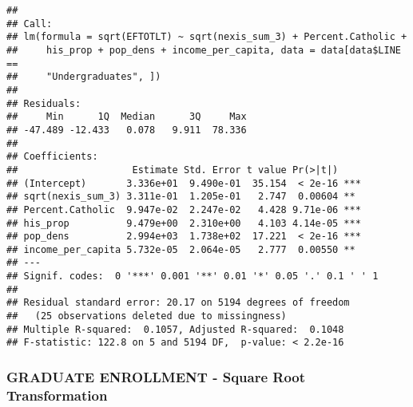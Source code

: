 \documentclass[]{article}
\newenvironment{Shaded}{\begin{snugshade}}{\end{snugshade}}
\newcommand{\KeywordTok}[1]{\textcolor[rgb]{0.13,0.29,0.53}{\textbf{#1}}}
\newcommand{\DataTypeTok}[1]{\textcolor[rgb]{0.13,0.29,0.53}{#1}}
\newcommand{\DecValTok}[1]{\textcolor[rgb]{0.00,0.00,0.81}{#1}}
\newcommand{\StringTok}[1]{\textcolor[rgb]{0.31,0.60,0.02}{#1}}
\newcommand{\OperatorTok}[1]{\textcolor[rgb]{0.81,0.36,0.00}{\textbf{#1}}}
\newcommand{\NormalTok}[1]{#1}
\begin{document}
\begin{verbatim}
## 
## Call:
## lm(formula = sqrt(EFTOTLT) ~ sqrt(nexis_sum_3) + Percent.Catholic + 
##     his_prop + pop_dens + income_per_capita, data = data[data$LINE == 
##     "Undergraduates", ])
## 
## Residuals:
##     Min      1Q  Median      3Q     Max 
## -47.489 -12.433   0.078   9.911  78.336 
## 
## Coefficients:
##                    Estimate Std. Error t value Pr(>|t|)    
## (Intercept)       3.336e+01  9.490e-01  35.154  < 2e-16 ***
## sqrt(nexis_sum_3) 3.311e-01  1.205e-01   2.747  0.00604 ** 
## Percent.Catholic  9.947e-02  2.247e-02   4.428 9.71e-06 ***
## his_prop          9.479e+00  2.310e+00   4.103 4.14e-05 ***
## pop_dens          2.994e+03  1.738e+02  17.221  < 2e-16 ***
## income_per_capita 5.732e-05  2.064e-05   2.777  0.00550 ** 
## ---
## Signif. codes:  0 '***' 0.001 '**' 0.01 '*' 0.05 '.' 0.1 ' ' 1
## 
## Residual standard error: 20.17 on 5194 degrees of freedom
##   (25 observations deleted due to missingness)
## Multiple R-squared:  0.1057, Adjusted R-squared:  0.1048 
## F-statistic: 122.8 on 5 and 5194 DF,  p-value: < 2.2e-16
\end{verbatim}

\subsubsection{GRADUATE ENROLLMENT - Square Root
Transformation}\label{graduate-enrollment---square-root-transformation-1}

\begin{Shaded}
\end{Shaded}
\end{document}
